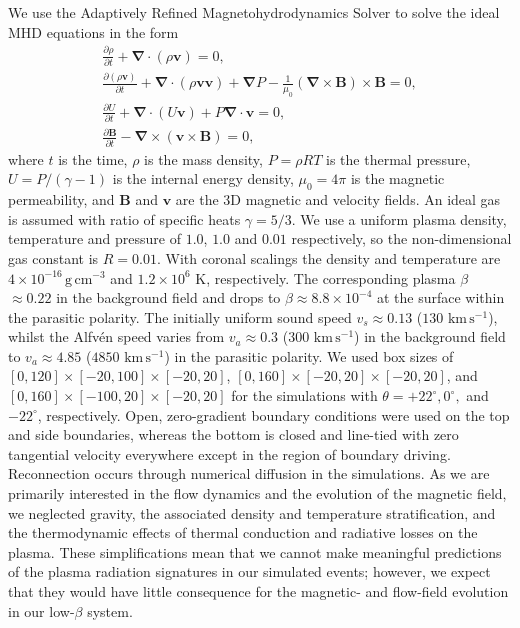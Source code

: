 \documentclass[twocolumn]{aastex6}
\begin{document}
We use the Adaptively Refined Magnetohydrodynamics Solver \citep[ARMS;][]{DeVore2008} to solve the ideal MHD equations in the form
\begin{gather}
\frac{\partial \rho}{\partial t} + \boldsymbol{\nabla}\cdot(\rho \mathbf{v}) = 0,\\
\frac{\partial (\rho \mathbf{v})}{\partial t}+\boldsymbol{\nabla}\cdot(\rho \mathbf{v}\mathbf{v}) + \boldsymbol{\nabla} P -\frac{1}{\mu_{0}}(\boldsymbol{\nabla}\times\mathbf{B})\times\mathbf{B} = 0,\\
\frac{\partial U}{\partial t}+\boldsymbol{\nabla}\cdot (U\mathbf{v})+P\boldsymbol{\nabla}\cdot\mathbf{v} = 0,\\
\frac{\partial \mathbf{B}}{\partial t}-\boldsymbol{\nabla}\times (\mathbf{v}\times\mathbf{B})=0,
\end{gather}
where $t$ is the time, $\rho$ is the mass density, $P = \rho R T$ is the thermal pressure, $U = P/(\gamma-1)$ is the internal energy density, $\mu_{0}=4\pi$ is the magnetic permeability, and $\mathbf{B}$ and $\mathbf{v}$ are the 3D magnetic and velocity fields. An ideal gas is assumed with ratio of specific heats $\gamma = 5/3$. We use a uniform plasma density, temperature and pressure of $1.0$, $1.0$ and $0.01$ respectively, so the non-dimensional gas constant is $R=0.01$. {With coronal scalings the density and temperature are $4\times 10^{-16} \,\text{g}\,\text{cm}^{-3}$ and $1.2\times 10^{6}$ K, respectively.} The corresponding plasma $\beta$ $\approx 0.22$ in the background field and drops to {$\beta \approx 8.8\times 10^{-4}$} at the surface within the parasitic polarity. The initially uniform sound speed $v_{s} \approx 0.13$ {($130 \text{ km}\, \text{s}^{-1}$)}, whilst the Alfv\'{e}n speed varies from $v_{a} \approx 0.3$ {($300 \text{ km}\,\text{s}^{-1}$)} in the background field to $v_{a} \approx 4.85$ {($4850 \text{ km}\,\text{s}^{-1}$)} in the parasitic polarity. We used box sizes of $[0,120]\times[-20,100]\times[-20,20]$, $[0,160]\times[-20,20]\times[-20,20]$, and $[0,160]\times[-100,20]\times[-20,20]$ for the simulations with $\theta = +22^\circ, 0^\circ,$ and $-22^\circ$, respectively. Open, zero-gradient boundary conditions were used on the top and side boundaries, whereas the bottom is closed and line-tied with zero tangential velocity everywhere except in the region of boundary driving. Reconnection occurs through numerical diffusion in the simulations. As we are primarily interested in the flow dynamics and the evolution of the magnetic field, we neglected gravity, the associated density and temperature stratification, and the thermodynamic effects of thermal conduction and radiative losses on the plasma. These simplifications mean that we cannot make meaningful predictions of the plasma radiation signatures in our simulated events; however, we expect that they would have little consequence for the magnetic- and flow-field evolution in our low-$\beta$ system. 
\end{document}

